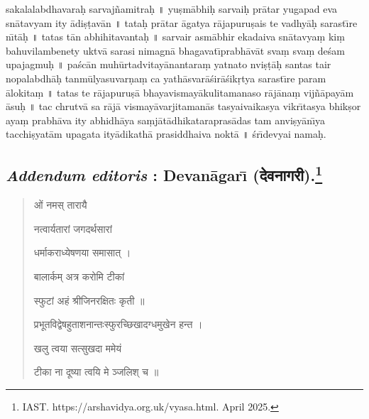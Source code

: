\documentclass[a4paper, 11pt, oneside, french, landscape, twocolumn]{article}
\begin{document}
sakalalabdhavara\d{h} sarvaj\~{n}amitra\d{h} \texthindi{॥} yu\d{s}m\={a}bhi\d{h} sarvai\d{h} pr\={a}tar yugapad eva sn\={a}tavyam ity \={a}di\d{s}\d{t}av\={a}n \texthindi{॥} tata\d{h} pr\={a}tar \={a}gatya r\={a}japuru\d{s}ais te vadhy\={a}\d{h} sarast\={\i}re n\={\i}t\={a}\d{h} \texthindi{॥} tatas t\={a}n abhihitavanta\d{h} \texthindi{॥} sarvair asm\={a}bhir ekadaiva sn\={a}tavya\d{m} ki\d{m} bahuvilambenety uktv\={a} sarasi nimagn\={a} bhagavat\={\i}prabh\={a}v\={a}t sva\d{m} sva\d{m} de\'{s}am upajagmu\d{h} \texthindi{॥} pa\'{s}c\={a}n muh\={u}rtadvitay\={a}nantara\d{m} yatnato nvi\d{s}\d{t}\={a}\d{h} santas tair nopalabdh\={a}\d{h} tanm\={u}lyasuvar\d{n}a\d{m} ca yath\={a}svar\={a}\'{s}ir\={a}\'{s}ik\d{r}tya sarast\={\i}re param \={a}lokita\d{m} \texthindi{॥} tatas te r\={a}japuru\d{s}\={a} bhayavismay\={a}kulitamanaso r\={a}j\={a}na\d{m} vij\~{n}\={a}pay\={a}m \={a}su\d{h} \texthindi{॥} tac chrutv\={a} sa r\={a}j\={a} vismay\={a}varjitaman\={a}s tasyaivaikasya vikr\={\i}tasya bhik\d{s}or aya\d{m} prabh\={a}va ity abhidh\={a}ya sa\d{m}j\={a}t\={a}dhikatarapras\={a}das tam anvi\d{s}y\={a}n\={\i}ya tacchi\d{s}yat\={a}m upagata ity\={a}dikath\={a} prasiddhaiva nokt\={a} \texthindi{॥} \'{s}r\={\i}devyai nama\d{h}.
\clearpage
\subsection[\emph{Addendum editoris} : Devan\={a}gar\={\i} \texthindi{(देवनागरी)}.]{\emph{Addendum editoris} : Devan\={a}gar\={\i} (\texthindi{देवनागरी}).\footnote{IAST. https://arshavidya.org.uk/vyasa.html. April 2025.}}
\begin{quotation}\footnotesize
\texthindi{ओं नमस् तारायै}

\bigskip

\texthindi{नत्वार्यतारां जगदर्थसारां}

\texthindi{धर्माकराध्येषणया समासात् ।}

\texthindi{बालार्कम् अत्र करोमि टीकां}

\texthindi{स्फुटां अहं श्रीजिनरक्षितः कृती ॥}

\bigskip

\texthindi{प्रभूतविद्वेषहुताशनान्तःस्फुरच्छिखादग्धमुखेन हन्त ।}

\texthindi{खलु त्वया सत्सुखदा ममेयं}

\texthindi{टीका ना दूष्या त्वयि मे ञ्जलिश् च ॥}
\end{quotation}
\end{document}
